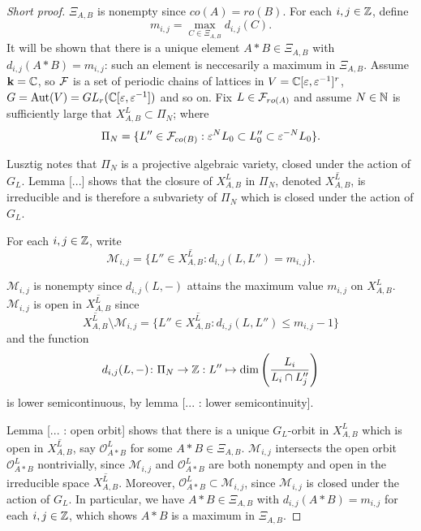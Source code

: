 \documentclass[a4paper, 11pt]{report}
\begin{document}
\begin{proof}[Short proof]
$\Xi_{A,B}$ is nonempty since $co(A)=ro(B)$. For each $i,j\in\mathbb{Z}$, define
\begin{equation*}
m_{i,j} = \max_{C\in\Xi_{A,B}} d_{i,j}(C).
\end{equation*}
It will be shown that there is a unique element $A\ast B\in \Xi_{A,B}$ with $d_{i,j}(A\ast B) = m_{i,j}$: such an element is neccesarily a maximum in $\Xi_{A,B}$. Assume $\mathbf{k}=\mathbb{C}$, so $\mathcal{F}$ is a set of periodic chains of lattices in $V = \mathbb{C}[\varepsilon,\varepsilon^{-1}]^r$, $G = \operatorname{Aut}(V) = GL_{r}(\mathbb{C}[\varepsilon,\varepsilon^{-1}])$ and so on. Fix $L\in\mathcal{F}_{ro(A)}$ and assume $N\in\mathbb{N}$ is sufficiently large that $X_{A,B}^L\subset \Pi_N$; where
\begin{equation*}
\Pi_N = \{L''\in\mathcal{F}_{co(B)}: \varepsilon^N L_0\subset L_0''\subset \varepsilon^{-N} L_0\}.
\end{equation*}

Lusztig notes \cite{lusztig99} that $\Pi_N$ is a projective algebraic variety, closed under the action of $G_L$. Lemma [...] shows that the closure of $X_{A,B}^L$ in $\Pi_N$, denoted $\overline{X_{A,B}^L}$, is irreducible and is therefore a subvariety of $\Pi_N$ which is closed under the action of $G_L$.

For each $i,j\in\mathbb{Z}$, write
\begin{equation*}
\mathcal{M}_{i,j} = \{L''\in\overline{X_{A,B}^L}: d_{i,j}(L,L'') = m_{i,j}\}.
\end{equation*}

$\mathcal{M}_{i,j}$ is nonempty since $d_{i,j}(L,-)$ attains the maximum value $m_{i,j}$ on $X_{A,B}^L$. $\mathcal{M}_{i,j}$ is open in $\overline{X_{A,B}^L}$ since
\begin{equation*}
\overline{X_{A,B}^L}\setminus \mathcal{M}_{i,j} = \{L''\in\overline{X_{A,B}^L}: d_{i,j}(L,L'')\le m_{i,j} - 1\}
\end{equation*}
and the function
\begin{equation*}
d_{i,j}(L,-)\colon\Pi_N\to\mathbb{Z} : L''\mapsto \dim\left(\frac{L_i}{L_i\cap L_j''}\right)
\end{equation*}
is lower semicontinuous, by lemma [... : lower semicontinuity].

Lemma [... : open orbit] shows that there is a unique $G_L$-orbit in $X_{A,B}^L$ which is open in $\overline{X_{A,B}^L}$, say $\mathcal{O}_{A\ast B}^L$ for some $A\ast B\in\Xi_{A,B}$. $\mathcal{M}_{i,j}$ intersects the open orbit $\mathcal{O}_{A\ast B}^L$ nontrivially, since $\mathcal{M}_{i,j}$ and $\mathcal{O}_{A\ast B}^L$ are both nonempty and open in the irreducible space $\overline{X_{A,B}^L}$. Moreover, $\mathcal{O}_{A\ast B}^L\subset \mathcal{M}_{i,j}$, since $\mathcal{M}_{i,j}$ is closed under the action of $G_L$. In particular, we have $A\ast B\in \Xi_{A,B}$ with $d_{i,j}(A\ast B) = m_{i,j}$ for each $i,j\in\mathbb{Z}$, which shows $A\ast B$ is a maximum in $\Xi_{A,B}$.


\end{proof}
\end{document}
